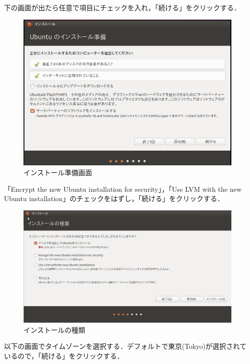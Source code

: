 下の画面が出たら任意で項目にチェックを入れ，「続ける」をクリックする．
\begin{figure}[H]
\centering
\includegraphics[width=15cm]{ubuntuinstall01.png}
\caption{インストール準備画面}\label{インストール準備画面}
\end{figure}

「Encrypt the new Ubuntu installation for security」，「Use LVM with the new Ubuntu installation」のチェックをはずし，「続ける」をクリックする．

\begin{figure}[H]
\centering
\includegraphics[width=15cm]{ubuntuinstall02.png}
\caption{インストールの種類}\label{インストール準備画面2}
\end{figure}

以下の画面でタイムゾーンを選択する．デフォルトで東京(Tokyo)が選択されているので，「続ける」をクリックする．

